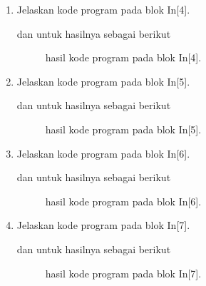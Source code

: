 \begin{enumerate}
\item Jelaskan kode program pada blok  In[4].

dan untuk hasilnya sebagai berikut
\begin{figure}[!htbp]
      \caption{hasil kode program pada blok  In[4].}
      \label{c144}
      \end{figure}

\item Jelaskan kode program pada blok  In[5].

dan untuk hasilnya sebagai berikut
\begin{figure}[!htbp]
      \caption{hasil kode program pada blok  In[5].}
      \label{c145}
      \end{figure}

\item Jelaskan kode program pada blok  In[6].

dan untuk hasilnya sebagai berikut
\begin{figure}[!htbp]
      \caption{hasil kode program pada blok  In[6].}
      \label{c146}
      \end{figure}

\item Jelaskan kode program pada blok  In[7].

dan untuk hasilnya sebagai berikut
\begin{figure}[!htbp]
      \caption{hasil kode program pada blok  In[7].}
      \label{c147}
      \end{figure}


\end{enumerate}
